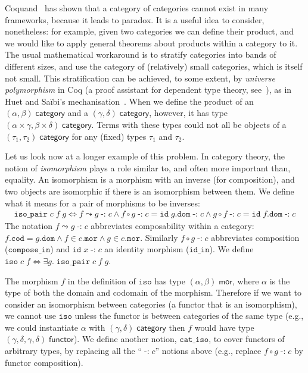 \documentclass[twoside,titlepage,11pt]{article}
\begin{document}
Coquand~\cite{DBLP:conf/lics/Coquand86} has shown that a category of categories cannot exist in many frameworks, because it leads to paradox.
It is a useful idea to consider, nonetheless: for example, given two categories we can define their product, and we would like to apply general theorems about products within a category to it.
The usual mathematical workaround is to stratify categories into bands of different sizes, and use the category of (relatively) small categories, which is itself not small.
This stratification can be achieved, to some extent, by \emph{universe polymorphism} in Coq (a proof assistant for dependent type theory, see~\cite{DBLP:conf/tphol/Bertot08}), as in Huet and Sa{\"i}bi's mechanisation~\cite{DBLP:conf/birthday/HuetS00}.
When we define the product of an $(\alpha,\beta)\;\mathsf{category}$ and a $(\gamma,\delta)\;\mathsf{category}$, however, it has type $(\alpha\times\gamma,\beta\times\delta)\;\mathsf{category}$.
Terms with these types could not all be objects of a $(\tau_1,\tau_2)\;\mathsf{category}$ for any (fixed) types $\tau_1$ and $\tau_2$.

Let us look now at a longer example of this problem.
In category theory, the notion of \emph{isomorphism} plays a role similar to, and often more important than, equality.
An isomorphism is a morphism with an inverse (for composition), and two objects are isomorphic if there is an isomorphism between them.
We define what it means for a pair of morphisms to be inverses:
\begin{align*}
\mathtt{iso\_pair}\;c\;f\;g\iff f\leadsto g\operatorname{\mathtt{-:}}c\land f\circ g\operatorname{\mathtt{-:}}c=\mathtt{id}\;g.\mathtt{dom}\operatorname{\mathtt{-:}}c\land g\circ f\operatorname{\mathtt{-:}}c=\mathtt{id}\;f.\mathtt{dom}\operatorname{\mathtt{-:}}c
\end{align*}
The notation $f\leadsto g\operatorname{\mathtt{-:}}c$ abbreviates composability within a category: $f.\mathtt{cod}=g.\mathtt{dom}\land f\in c.\mathtt{mor}\land g\in c.\mathtt{mor}$.
Similarly $f\circ g\operatorname{\mathtt{-:}}c$ abbreviates composition ($\mathtt{compose\_in}$) and $\mathtt{id}\;x\operatorname{-:}c$ an identity morphism ($\mathtt{id\_in}$).
We define $\mathtt{iso}\;c\;f \iff\exists{g}.\;\mathtt{iso\_pair}\;c\;f\;g$.

The morphism $f$ in the definition of $\mathtt{iso}$ has type $(\alpha,\beta)\;\mathsf{mor}$, where $\alpha$ is the type of both the domain and codomain of the morphism.
Therefore if we want to consider an isomorphism between categories (a functor that is an isomorphism), we cannot use $\mathtt{iso}$ unless the functor is between categories of the same type (e.g., we could instantiate $\alpha$ with $(\gamma,\delta)\;\mathsf{category}$ then $f$ would have type $(\gamma,\delta,\gamma,\delta)\;\mathsf{functor}$).
We define another notion, $\mathtt{cat\_iso}$, to cover functors of arbitrary types, by replacing all the ``$\operatorname{\mathtt{-:}}c$'' notions above (e.g., replace $f\circ g\operatorname{\mathtt{-:}}c$ by functor composition).
\end{document}
